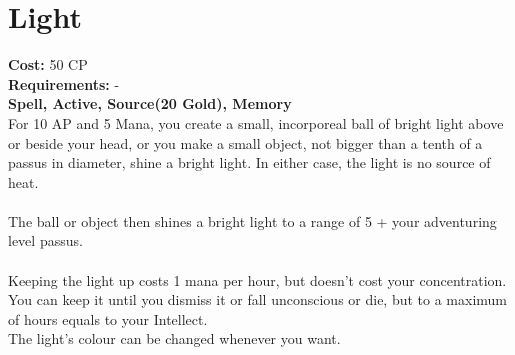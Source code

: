 \section{Light}
\textbf{Cost:} 50 CP\\
\textbf{Requirements:} -\\
\textbf{Spell, Active, Source(20 Gold), Memory}\\
For 10 AP and 5 Mana, you create a small, incorporeal ball of bright light above or beside your head, or you make a small object, not bigger than a tenth of a passus in diameter, shine a bright light. In either case, the light is no source of heat.\\
\\
The ball or object then shines a bright light to a range of 5 + your adventuring level passus.\\
\\
Keeping the light up costs 1 mana per hour, but doesn't cost your concentration. You can keep it until you dismiss it or fall unconscious or die, but to a maximum of hours equals to your Intellect.
\\
The light's colour can be changed whenever you want.\\